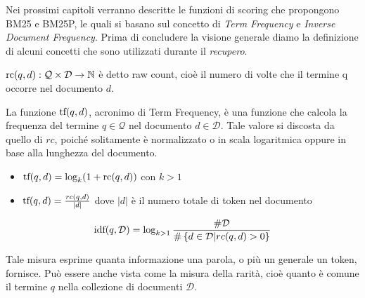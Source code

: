 \pagebreak

Nei prossimi capitoli verranno descritte le funzioni di scoring che propongono BM25 e BM25P, le quali si basano sul concetto di \textit{Term Frequency} e \textit{Inverse Document Frequency}.
Prima di concludere la visione generale diamo la definizione di alcuni concetti che sono utilizzati durante il \textit{recupero}.

\begin{definizione}\label{def:raw_count}
	$\text{rc}(q, d) : \mathcal{Q} \times \mathcal{D} \rightarrow \mathbb{N}$ è detto raw count, cioè il numero di volte che
	il termine q occorre nel documento $d$.
\end{definizione}

\begin{definizione}\label{def:}
	La funzione $\text{tf}(q,d)$, acronimo di Term Frequency, è una funzione che calcola la frequenza del
	termine $q \in \mathcal{Q}$ nel documento $d \in \mathcal{D}$.
	Tale valore si discosta da quello di $rc$, poiché solitamente è normalizzato o in scala logaritmica
	oppure in base alla lunghezza del documento.
	
	\begin{itemize}
		\item $\text{tf}(q,d) = \log_{k}(1+\text{rc}(q,d))$ con $k>1$
		\item $\text{tf}(q,d) = \frac{rc(q,d)}{|d|}$ dove $|d|$ è il numero totale di token nel documento
	\end{itemize}
\end{definizione}

\begin{definizione}\label{def:idf}
	$$
	\text{idf}(q, \mathcal{D}) = \log_{k>1}{
		\frac{\#\mathcal{D}}{
			\#
			\left\{
			d \in \mathcal{D} \middle \lvert rc(q,d) > 0
			\right\} 
		}
	}
	$$
	
	Tale misura esprime quanta informazione una parola, o più un generale un token, fornisce.
	Può essere anche vista come la misura della rarità, cioè quanto è comune il termine $q$
	nella collezione di documenti $\mathcal{D}$.
\end{definizione}




